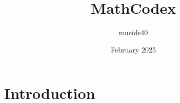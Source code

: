 \documentclass{article}
\title{MathCodex}
\author{mueids40 }
\date{February 2025}
\begin{document}
\maketitle

\section{Introduction}
\end{document}
